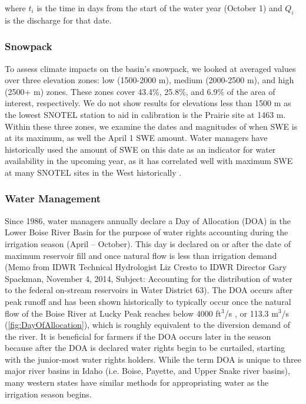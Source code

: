 \documentclass[water,article,submit,moreauthors,pdftex,10pt,a4paper]{mdpi}
\theoremstyle{mdpi}
\newcounter{ex}
\newcounter{re}
\theoremstyle{mdpidefinition}
\begin{document}
where $t_i$ is the time in days from the start of the water year (October 1) and $Q_i$ is the discharge for that date. 

\subsubsection{Snowpack}

To assess climate impacts on the basin’s snowpack, we looked at averaged values over three elevation zones: low (1500-2000 m), medium (2000-2500 m), and high (2500+ m) zones. These zones cover 43.4\%, 25.8\%, and 6.9\% of the area of interest, respectively. We do not show results for elevations less than 1500 m as the lowest SNOTEL station to aid in calibration is the Prairie site at 1463 m. Within these three zones, we examine the dates and magnitudes of when SWE is at its maximum, as well the April 1 SWE amount. Water managers have historically used the amount of SWE on this date as an indicator for water availability in the upcoming year, as it has correlated well with maximum SWE at many SNOTEL sites in the West historically \citep{Bohr:2001bc}.

\subsubsection{Water Management}

Since 1986, water managers annually declare a Day of Allocation (DOA) in the Lower Boise River Basin for the purpose of water rights accounting during the irrigation season (April – October). This day is declared on or after the date of maximum reservoir fill and once natural flow is less than irrigation demand (Memo from IDWR Technical Hydrologist Liz Cresto to IDWR Director Gary Spackman, November 4, 2014, Subject: Accounting for the distribution of water to the federal on-stream reservoirs in Water District 63). The DOA occurs after peak runoff and has been shown historically to typically occur once the natural flow of the Boise River at Lucky Peak reaches below 4000 ft${}^3$/s \citep{Garst:2017bg}, or 113.3 m${}^3$/s (\cref{fig:DayOfAllocation}), which is roughly equivalent to the diversion demand of the river. It is beneficial for farmers if the DOA occurs later in the season because after the DOA is declared water rights begin to be curtailed, starting with the junior-most water rights holders. While the term DOA is unique to three major river basins in Idaho (i.e. Boise, Payette, and Upper Snake river basins), many western states have similar methods for appropriating water as the irrigation season begins.
\end{document}
